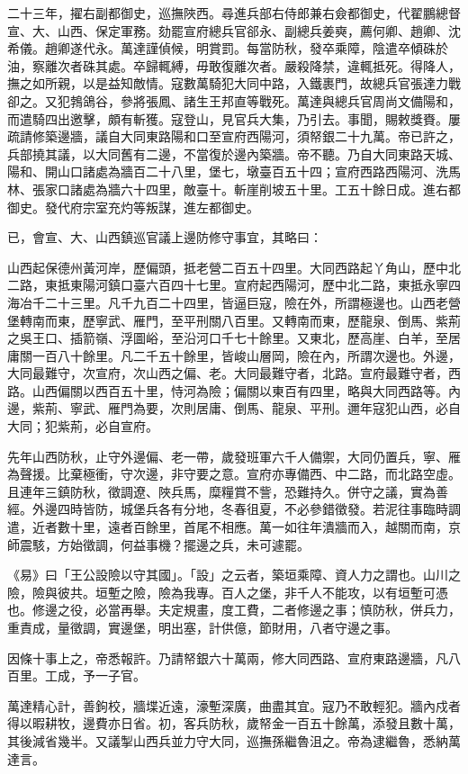 \begin{pinyinscope}
二十三年，擢右副都御史，巡撫陜西。尋進兵部右侍郎兼右僉都御史，代翟鵬總督宣、大、山西、保定軍務。劾罷宣府總兵官郤永、副總兵姜奭，薦何卿、趙卿、沈希儀。趙卿遂代永。萬達謹偵候，明賞罰。每當防秋，發卒乘障，陰遣卒傾硃於油，察離次者硃其處。卒歸輒縛，毋敢復離次者。嚴殺降禁，違輒抵死。得降人，撫之如所親，以是益知敵情。寇數萬騎犯大同中路，入鐵裹門，故總兵官張達力戰卻之。又犯鵓鴿谷，參將張鳳、諸生王邦直等戰死。萬達與總兵官周尚文備陽和，而遣騎四出邀擊，頗有斬獲。寇登山，見官兵大集，乃引去。事聞，賜敕獎賚。屢疏請修築邊牆，議自大同東路陽和口至宣府西陽河，須帑銀二十九萬。帝已許之，兵部撓其議，以大同舊有二邊，不當復於邊內築牆。帝不聽。乃自大同東路天城、陽和、開山口諸處為牆百二十八里，堡七，墩臺百五十四；宣府西路西陽河、洗馬林、張家口諸處為牆六十四里，敵臺十。斬崖削坡五十里。工五十餘日成。進右都御史。發代府宗室充灼等叛謀，進左都御史。

已，會宣、大、山西鎮巡官議上邊防修守事宜，其略曰：

山西起保德州黃河岸，歷偏頭，抵老營二百五十四里。大同西路起丫角山，歷中北二路，東抵東陽河鎮口臺六百四十七里。宣府起西陽河，歷中北二路，東抵永寧四海冶千二十三里。凡千九百二十四里，皆逼巨寇，險在外，所謂極邊也。山西老營堡轉南而東，歷寧武、雁門，至平刑關八百里。又轉南而東，歷龍泉、倒馬、紫荊之吳王口、插箭嶺、浮圖峪，至沿河口千七十餘里。又東北，歷高崖、白羊，至居庸關一百八十餘里。凡二千五十餘里，皆峻山層岡，險在內，所謂次邊也。外邊，大同最難守，次宣府，次山西之偏、老。大同最難守者，北路。宣府最難守者，西路。山西偏關以西百五十里，恃河為險；偏關以東百有四里，略與大同西路等。內邊，紫荊、寧武、雁門為要，次則居庸、倒馬、龍泉、平刑。邇年寇犯山西，必自大同；犯紫荊，必自宣府。

先年山西防秋，止守外邊偏、老一帶，歲發班軍六千人備禦，大同仍置兵，寧、雁為聲援。比棄極衝，守次邊，非守要之意。宣府亦專備西、中二路，而北路空虛。且連年三鎮防秋，徵調遼、陜兵馬，糜糧賞不訾，恐難持久。併守之議，實為善經。外邊四時皆防，城堡兵各有分地，冬春徂夏，不必參錯徵發。若泥往事臨時調遣，近者數十里，遠者百餘里，首尾不相應。萬一如往年潰牆而入，越關而南，京師震駭，方始徵調，何益事機？擺邊之兵，未可遽罷。

《易》曰「王公設險以守其國」。「設」之云者，築垣乘障、資人力之謂也。山川之險，險與彼共。垣塹之險，險為我專。百人之堡，非千人不能攻，以有垣塹可憑也。修邊之役，必當再舉。夫定規畫，度工費，二者修邊之事；慎防秋，併兵力，重責成，量徵調，實邊堡，明出塞，計供億，節財用，八者守邊之事。

因條十事上之，帝悉報許。乃請帑銀六十萬兩，修大同西路、宣府東路邊牆，凡八百里。工成，予一子官。

萬達精心計，善鉤校，牆堞近遠，濠塹深廣，曲盡其宜。寇乃不敢輕犯。牆內戍者得以暇耕牧，邊費亦日省。初，客兵防秋，歲帑金一百五十餘萬，添發且數十萬，其後減省幾半。又議掣山西兵並力守大同，巡撫孫繼魯沮之。帝為逮繼魯，悉納萬達言。


\end{pinyinscope}
